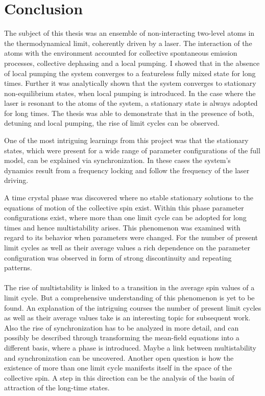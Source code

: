 \chapter{Conclusion}
The subject of this thesis was an ensemble of non-interacting two-level atoms in the thermodynamical limit, coherently driven by a laser. The interaction of the atoms with the environment accounted for collective spontaneous emission processes, collective dephasing and a local pumping. I showed that in the absence of local pumping the system converges to a featureless fully mixed state for long times. Further it was analytically shown that the system converges to stationary non-equilibrium states, when local pumping is introduced. In the case where the laser is resonant to the atoms of the system, a stationary state is always adopted for long times. The thesis was able to demonstrate that in the presence of both, detuning and local pumping, the rise of limit cycles can be observed.%

One of the most intriguing learnings from this project was that the stationary states, which were present for a wide range of parameter configurations of the full model, can be explained via synchronization. In these cases the system's dynamics result from a frequency locking and follow the frequency of the laser driving. 

A time crystal phase was discovered where no stable stationary solutions to the equations of motion of the collective spin exist. Within this phase parameter configurations exist, where more than one limit cycle can be adopted for long times and hence multistability arises. This phenomenon was examined with regard to its behavior when parameters were changed. For the number of present limit cycles as well as their average values a rich dependence on the parameter configuration was observed in form of strong discontinuity and repeating patterns.\\\\
The rise of multistability is linked to a transition in the average spin values of a limit cycle. But a comprehensive understanding of this phenomenon is yet to be found. An explanation of the intriguing courses the number of present limit cycles as well as their average values take is an interesting topic for subsequent work. Also the rise of synchronization has to be analyzed in more detail, and can possibly be described through transforming the mean-field equations into a different basis, where a phase is introduced. Maybe a link between multistability and synchronization can be uncovered. Another open question is how the existence of more than one limit cycle manifests itself in the space of the collective spin. A step in this direction can be the analysis of the basin of attraction of the long-time states.

